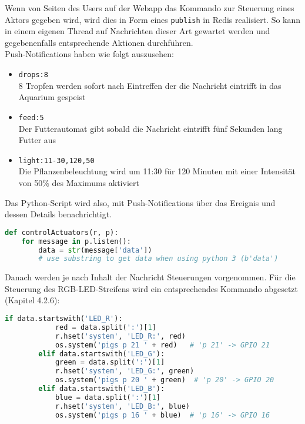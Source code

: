 \newpage
{}
Wenn von Seiten des Users auf der Webapp das Kommando zur Steuerung eines Aktors gegeben wird, wird dies in Form eines \texttt{publish} in Redis realisiert. So kann in einem eigenen Thread auf Nachrichten dieser Art gewartet werden und gegebenenfalls entsprechende Aktionen durchführen. \\
Push-Notifications haben wie folgt auszusehen:
\begin{itemize}
    \item \texttt{drops:8} \\
    8 Tropfen werden sofort nach Eintreffen der die Nachricht eintrifft in das Aquarium gespeist
    \item \texttt{feed:5} \\
    Der Futterautomat gibt sobald die Nachricht eintrifft fünf Sekunden lang Futter aus
    \item \texttt{light:11-30,120,50} \\
    Die Pflanzenbeleuchtung wird um 11:30 für 120 Minuten mit einer Intensität von 50\% des Maximums aktiviert
\end{itemize}
Das Python-Script wird also, mit Push-Notifications über das Ereignis und dessen Details benachrichtigt.
\begin{lstlisting}[language=Python, caption=Push-Notification für Aktorensteuerung erhalten]
def controlActuators(r, p):
    for message in p.listen():
        data = str(message['data'])
        # use substring to get data when using python 3 (b'data')
\end{lstlisting}
\vspace{-0.5cm}
Danach werden je nach Inhalt der Nachricht Steuerungen vorgenommen. Für die Steuerung des \gls{RGB}-\gls{LED}-Streifens wird ein entsprechendes Kommando abgesetzt (Kapitel 4.2.6):
\begin{lstlisting}[language=Python, caption=Steuern des RGB-LED-Streifens]
        if data.startswith('LED_R'):
            red = data.split(':')[1]
            r.hset('system', 'LED_R:', red)
            os.system('pigs p 21 ' + red)   # 'p 21' -> GPIO 21
        elif data.startswith('LED_G'):
            green = data.split(':')[1]
            r.hset('system', 'LED_G:', green)
            os.system('pigs p 20 ' + green)  # 'p 20' -> GPIO 20
        elif data.startswith('LED_B'):
            blue = data.split(':')[1]
            r.hset('system', 'LED_B:', blue)
            os.system('pigs p 16 ' + blue)  # 'p 16' -> GPIO 16
\end{lstlisting}
